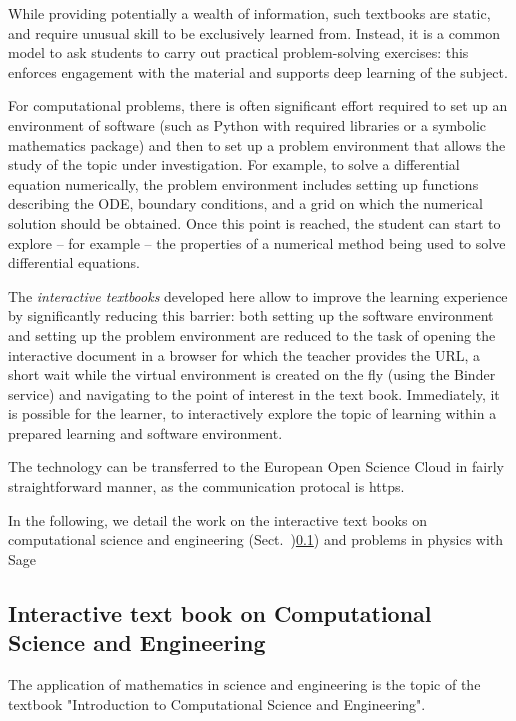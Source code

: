 \documentclass{deliverablereport}
\begin{document}
While providing potentially a wealth of information, such textbooks
are static, and require unusual skill to be exclusively learned
from. Instead, it is a common model to ask students to carry out
practical problem-solving exercises: this enforces engagement with the
material and supports deep learning of the subject.

For computational problems, there is often significant effort required
to set up an environment of software (such as Python with required
libraries or a symbolic mathematics package) and then to set up a
problem environment that allows the study of the topic under
investigation. For example, to solve a differential equation
numerically, the problem environment includes setting up functions
describing the ODE, boundary conditions, and a grid on which the
numerical solution should be obtained. Once this point is reached, the
student can start to explore -- for example -- the properties of a
numerical method being used to solve differential equations.

The \emph{interactive textbooks} developed here allow to improve the
learning experience by significantly reducing this barrier: both
setting up the software environment and setting up the problem
environment are reduced to the task of opening the interactive
document in a browser for which the teacher provides the URL, a short
wait while the virtual environment is created on the fly (using the
Binder service) and navigating to the point of interest in the text
book. Immediately, it is possible for the learner, to interactively
explore the topic of learning within a prepared learning and software
environment.

The technology can be transferred to the European Open Science Cloud
in fairly straightforward manner, as the communication protocal is https.

In the following, we detail the work on the interactive text books on
computational science and engineering (Sect.~)\ref{sec:computational-science-and-engineering})
and problems in physics with Sage 

\subsection{Interactive text book on Computational Science and Engineering}
\label{sec:computational-science-and-engineering}


The application of mathematics in science and engineering is the topic
of the textbook "Introduction to Computational Science and
Engineering".
\end{document}
